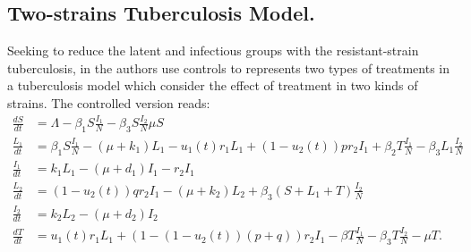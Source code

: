 \subsection{Two-strains Tuberculosis Model.}
Seeking to reduce the latent and infectious groups with the 
resistant-strain tuberculosis, in \cite{Lenhart2002} the authors  use 
controls to represents two types of treatments in a tuberculosis model 
which consider the effect of treatment in two kinds of strains. The 
controlled version reads:
%
%	
%
%
	\begin{equation}\label{eqn:MDR-TB_model}
	  \begin{aligned}
	    \frac{dS}{dt} &=
		    \Lambda - \beta_1 S \frac{I_1}{N} 
		    - \beta_3 S \frac{I_2}{N}
		    \mu S
		  \\
		  \frac{L_1}{dt} &=
			  \beta_1 S \frac{I_1}{N}
			  - (\mu + k_1) L_1
			  - u_1 (t) r_1 L_1
			  + (1 - u_2 (t)) p r_2 I_1
				+ \beta_2 T \frac{I_1}{N}
				- \beta_3 L_1 \frac{I_2}{N}
			\\
			\frac{I_1}{dt} &= 
				k_1 L_1
				- (\mu + d_1) I_1
				-r_2 I_1
			\\
			\frac{L_2}{dt} &=
				(1 - u_2(t)) q r_2 I_1
				- (\mu + k_2) L_2
				+ \beta_3 (S + L_1 + T) \frac{I_2}{N}
			\\
			\frac{I_2}{dt} &=
				k_2 L_2 - (\mu + d_2) I_2
			\\
			\frac{d T}{dt} &=
				u_1(t) r_1 L_1
				+ (1 - (1 - u_2(t))(p + q)) r_2 I_1
				- \beta T \frac{I_1}{N}
				- \beta_3 T \frac{I_2}{N}
				-\mu T.
	  \end{aligned}
	\end{equation}

